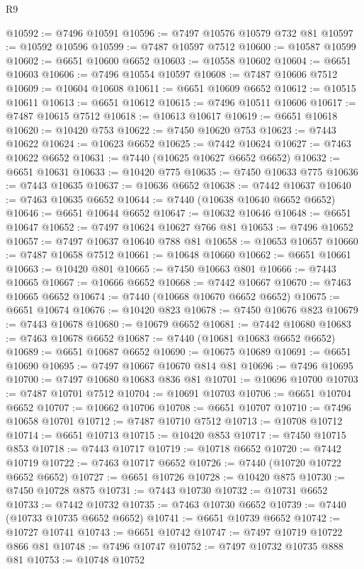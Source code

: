 \begin{lexlean}{R9}
\begin{coremodule}
{{{{{{{{{{{{{{{{{{{{{{{{{{{{{{{{{{{{{{{{{{{{{{{{{{{{{{{{{{{{{{{{{{{{{{{{{{{{{{{{{{{{@10592 := @7496 @10591
@10596 := @7497 @10576 @10579 @732 @81
@10597 := @10592 @10596
@10599 := @7487 @10597 @7512
@10600 := @10587 @10599
@10602 := @6651 @10600 @6652
@10603 := @10558 @10602
@10604 := @6651 @10603
@10606 := @7496 @10554 @10597
@10608 := @7487 @10606 @7512
@10609 := @10604 @10608
@10611 := @6651 @10609 @6652
@10612 := @10515 @10611
@10613 := @6651 @10612
@10615 := @7496 @10511 @10606
@10617 := @7487 @10615 @7512
@10618 := @10613 @10617
@10619 := @6651 @10618
@10620 := @10420 @753
@10622 := @7450 @10620 @753
@10623 := @7443 @10622
@10624 := @10623 @6652
@10625 := @7442 @10624
@10627 := @7463 @10622 @6652
@10631 := @7440 (@10625 @10627 @6652 @6652)
@10632 := @6651 @10631
@10633 := @10420 @775
@10635 := @7450 @10633 @775
@10636 := @7443 @10635
@10637 := @10636 @6652
@10638 := @7442 @10637
@10640 := @7463 @10635 @6652
@10644 := @7440 (@10638 @10640 @6652 @6652)
@10646 := @6651 @10644 @6652
@10647 := @10632 @10646
@10648 := @6651 @10647
@10652 := @7497 @10624 @10627 @766 @81
@10653 := @7496 @10652
@10657 := @7497 @10637 @10640 @788 @81
@10658 := @10653 @10657
@10660 := @7487 @10658 @7512
@10661 := @10648 @10660
@10662 := @6651 @10661
@10663 := @10420 @801
@10665 := @7450 @10663 @801
@10666 := @7443 @10665
@10667 := @10666 @6652
@10668 := @7442 @10667
@10670 := @7463 @10665 @6652
@10674 := @7440 (@10668 @10670 @6652 @6652)
@10675 := @6651 @10674
@10676 := @10420 @823
@10678 := @7450 @10676 @823
@10679 := @7443 @10678
@10680 := @10679 @6652
@10681 := @7442 @10680
@10683 := @7463 @10678 @6652
@10687 := @7440 (@10681 @10683 @6652 @6652)
@10689 := @6651 @10687 @6652
@10690 := @10675 @10689
@10691 := @6651 @10690
@10695 := @7497 @10667 @10670 @814 @81
@10696 := @7496 @10695
@10700 := @7497 @10680 @10683 @836 @81
@10701 := @10696 @10700
@10703 := @7487 @10701 @7512
@10704 := @10691 @10703
@10706 := @6651 @10704 @6652
@10707 := @10662 @10706
@10708 := @6651 @10707
@10710 := @7496 @10658 @10701
@10712 := @7487 @10710 @7512
@10713 := @10708 @10712
@10714 := @6651 @10713
@10715 := @10420 @853
@10717 := @7450 @10715 @853
@10718 := @7443 @10717
@10719 := @10718 @6652
@10720 := @7442 @10719
@10722 := @7463 @10717 @6652
@10726 := @7440 (@10720 @10722 @6652 @6652)
@10727 := @6651 @10726
@10728 := @10420 @875
@10730 := @7450 @10728 @875
@10731 := @7443 @10730
@10732 := @10731 @6652
@10733 := @7442 @10732
@10735 := @7463 @10730 @6652
@10739 := @7440 (@10733 @10735 @6652 @6652)
@10741 := @6651 @10739 @6652
@10742 := @10727 @10741
@10743 := @6651 @10742
@10747 := @7497 @10719 @10722 @866 @81
@10748 := @7496 @10747
@10752 := @7497 @10732 @10735 @888 @81
@10753 := @10748 @10752
}}}}}}}}}}}}}}}}}}}}}}}}}}}}}}}}}}}}}}}}}}}}}}}}}}}}}}}}}}}}}}}}}}}}}}}}}}}}}}}}}}}}
\end{coremodule}
\end{lexlean}

